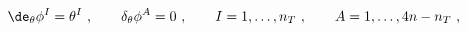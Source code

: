 \begin{equation} \label{Frob}
  \de_\theta \phi^I = \theta^I\ ,\qquad \delta_\theta \phi^A = 0\ ,
  \qquad I = 1,\dots, n_T\ ,\qquad A = 1,\dots, 4n-n_T\ ,
 \end{equation}

